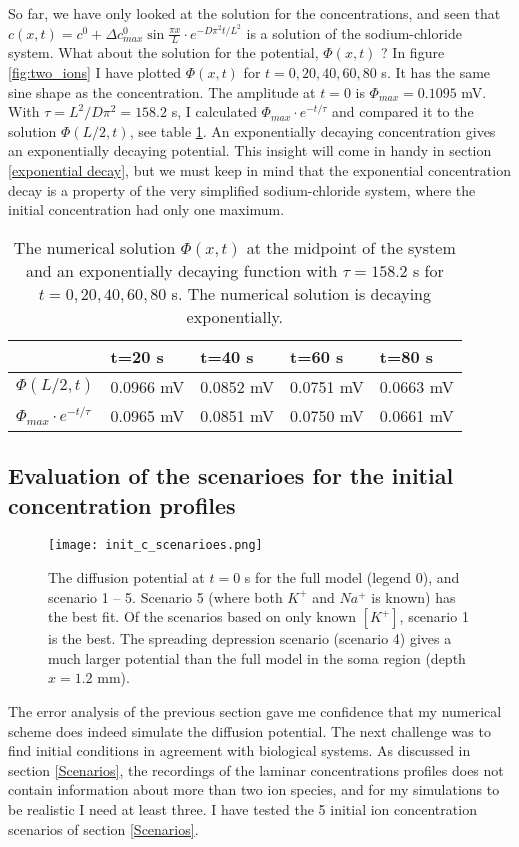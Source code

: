 \documentclass{article}
\begin{document}
So far, we have only looked at the solution for the concentrations, and seen that $c(x,t) =c^0 + \Delta c^0_{max} \sin \frac{ \pi x}{L}\cdot e^{-D\pi^2 t /L^2}$ is a solution of the sodium-chloride system. What about the solution for the potential, $\Phi(x,t)$ ? In figure \ref{fig:two_ions} I have plotted $\Phi(x,t)$ for $t=0,20,40,60,80$ s. It has the same sine shape as the concentration. The amplitude at $t=0$ is $\Phi_{max} = 0.1095$ mV. With $\tau = L^2/D\pi^2 = 158.2$ s, I calculated $\Phi_{max} \cdot e^{-t/{\tau}}$ and compared it to the solution $\Phi(L/2,t)$, see table \ref{tab:error2}. An exponentially decaying concentration gives an exponentially decaying potential. This insight will come in handy in section \ref{exponential decay}, but we must keep in mind that the exponential concentration decay is a property of the very simplified sodium-chloride system, where the initial concentration had only one maximum. 

\begin{table}[h!]
  \centering
  \caption{The numerical solution $\Phi(x,t)$ at the midpoint of the system and an exponentially decaying function with $\tau = 158.2$ s for $t=0,20,40,60,80$ s. The numerical solution is decaying exponentially. }
  \label{tab:error2}
  \begin{tabular}{l||l|l|l|l}
 & t=20 s & t=40 s & t=60 s & t=80 s\\
 \hline
$\Phi(L/2,t)$  & 0.0966 mV &  0.0852 mV & 0.0751 mV & 0.0663 mV\\
\hline
$\Phi_{max} \cdot e^{-t/{\tau}}$  & 0.0965 mV & 0.0851 mV & 0.0750 mV & 0.0661 mV\\


 \end{tabular}
\end{table}


\subsection{Evaluation of the scenarioes for the initial concentration profiles}\label{The K/Na assumtion}

\begin{figure}
  \texttt{[image: init\_c\_scenarioes.png]}
  \caption{The diffusion potential at $t=0$ s for the full model (legend 0), and scenario 1 -- 5. Scenario 5 (where both $K^+$ and $Na^+$ is known) has the best fit. Of the scenarios based on only known $[K^+]$, scenario 1 is the best. The spreading depression scenario (scenario 4) gives a much larger potential than the full model in the soma region (depth $x=1.2$ mm). }
  \label{fig:init_c_scenarioes}
\end{figure}
The error analysis of the previous section gave me confidence that my numerical scheme does indeed simulate the diffusion potential. The next challenge was to find initial conditions in agreement with biological systems. As discussed in section \ref{Scenarios}, the recordings of the laminar concentrations profiles does not contain information about more than two ion species, and for my simulations to be realistic I need at least three. I have tested the 5 initial ion concentration scenarios of section \ref{Scenarios}. 
\end{document}
